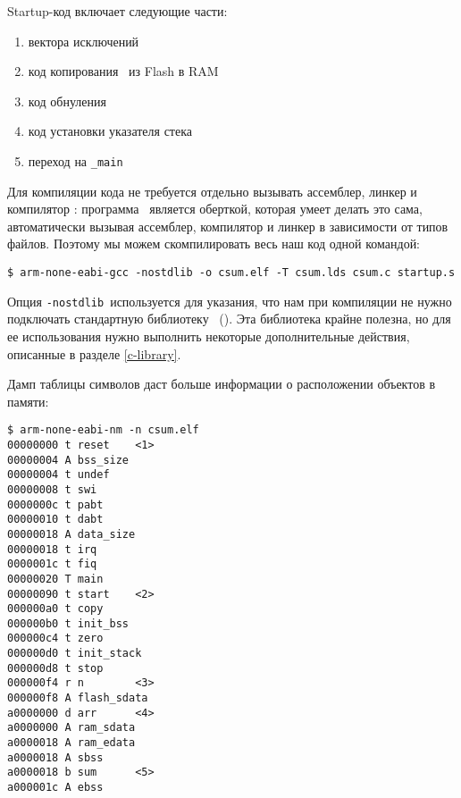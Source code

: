 

Startup-код включает следующие части:

\begin{enumerate}[nosep]
  \item 
    вектора исключений
  \item 
    код копирования \ из Flash в RAM
  \item 
    код обнуления 
  \item 
    код установки указателя стека
  \item 
    переход на \verb|_main|
\end{enumerate}


Для компиляции кода не требуется отдельно вызывать ассемблер, линкер и
компилятор \ci: программа \ является оберткой, которая умеет делать
это сама, автоматически вызывая ассемблер, компилятор и линкер в зависимости от
типов файлов. Поэтому мы можем скомпилировать весь наш код одной командой:

\begin{verbatim}
$ arm-none-eabi-gcc -nostdlib -o csum.elf -T csum.lds csum.c startup.s
\end{verbatim}

Опция \verb|-nostdlib|\ используется для указания, что нам при компиляции
не нужно подключать стандартную библиотеку \ci\ (). Эта библиотека
крайне полезна, но для ее использования нужно выполнить некоторые дополнительные
действия, описанные в разделе \ref{c-library}.

Дамп таблицы символов даст больше информации о расположении объектов в памяти:

\begin{verbatim}
$ arm-none-eabi-nm -n csum.elf
00000000 t reset	<1>
00000004 A bss_size
00000004 t undef
00000008 t swi
0000000c t pabt
00000010 t dabt
00000018 A data_size
00000018 t irq
0000001c t fiq
00000020 T main
00000090 t start	<2>
000000a0 t copy
000000b0 t init_bss
000000c4 t zero
000000d0 t init_stack
000000d8 t stop
000000f4 r n		<3>
000000f8 A flash_sdata
a0000000 d arr		<4>
a0000000 A ram_sdata
a0000018 A ram_edata
a0000018 A sbss
a0000018 b sum		<5>
a000001c A ebss
\end{verbatim}

